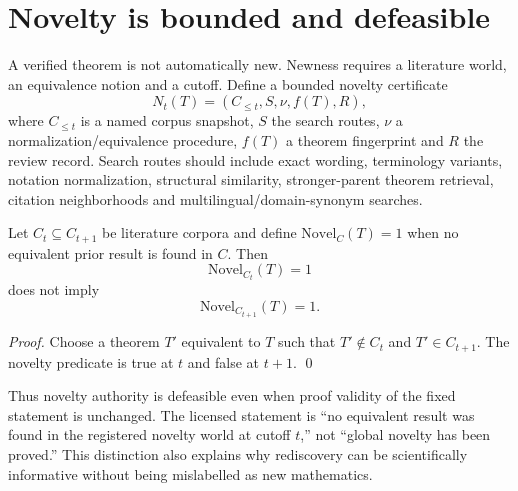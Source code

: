\section{Novelty is bounded and defeasible}

A verified theorem is not automatically new. Newness requires a literature world, an equivalence notion and a cutoff. Define a bounded novelty certificate
\[
N_t(T)=(C_{\le t},S,\nu,f(T),R),
\]
where $C_{\le t}$ is a named corpus snapshot, $S$ the search routes, $\nu$ a normalization/equivalence procedure, $f(T)$ a theorem fingerprint and $R$ the review record. Search routes should include exact wording, terminology variants, notation normalization, structural similarity, stronger-parent theorem retrieval, citation neighborhoods and multilingual/domain-synonym searches.

\begin{proposition}
Let $C_t\subseteq C_{t+1}$ be literature corpora and define $\mathrm{Novel}_{C}(T)=1$ when no equivalent prior result is found in $C$. Then
\[
\mathrm{Novel}_{C_t}(T)=1
\]
does not imply
\[
\mathrm{Novel}_{C_{t+1}}(T)=1.
\]
\end{proposition}

\begin{proof}
Choose a theorem $T'$ equivalent to $T$ such that $T'\notin C_t$ and $T'\in C_{t+1}$. The novelty predicate is true at $t$ and false at $t+1$. \qed
\end{proof}

Thus novelty authority is defeasible even when proof validity of the fixed statement is unchanged. The licensed statement is ``no equivalent result was found in the registered novelty world at cutoff $t$,'' not ``global novelty has been proved.'' This distinction also explains why rediscovery can be scientifically informative without being mislabelled as new mathematics.
